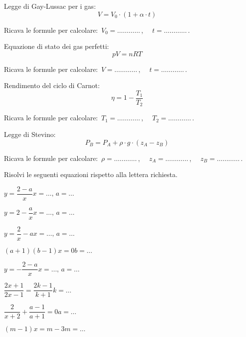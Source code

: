 \begin{esercizio}
\label{ese:20.64}
Legge di Gay-Lussac per i gas:
\begin{equation*}
  V=V_{0}\cdot (1+\alpha \cdot t)
\end{equation*}

Ricava le formule per calcolare:~\(V_0=\ldots\ldots\ldots\ldots\)\,, \(\quad 
t=\ldots\ldots\ldots\ldots\)\,.
\end{esercizio}

\begin{esercizio}
\label{ese:20.65}
Equazione di stato dei gas perfetti:
\begin{equation*}
  pV=nRT
\end{equation*}

Ricava le formule per calcolare:~\(V=\ldots\ldots\ldots\ldots\)\,, \(\quad 
t=\ldots\ldots\ldots\ldots\)\,.
\end{esercizio}

\begin{esercizio}
\label{ese:20.66}
Rendimento del ciclo di Carnot:
\begin{equation*}
  \eta =1-\dfrac{T_{1}}{T_{2}}
\end{equation*}

Ricava le formule per calcolare:~\(T_1=\ldots\ldots\ldots\ldots\)\,, \(\quad 
T_2=\ldots\ldots\ldots\ldots\)\,.
\end{esercizio}

\begin{esercizio}
\label{ese:20.67}
Legge di Stevino:
\begin{equation*}
  P_{B}=P_{A}+\rho \cdot g\cdot (z_{A}-z_{B})
\end{equation*}

Ricava le formule per calcolare:~\(\rho=\ldots\ldots\ldots\ldots\)\,, \(\quad 
z_A=\ldots\ldots\ldots\ldots\)\,, \(\quad z_B =\ldots\ldots\ldots\ldots\)\,.
\end{esercizio}


\begin{esercizio}
\label{ese:20.68}
Risolvi le seguenti equazioni rispetto alla lettera richiesta.
\begin{multicols}{2}
\TabPositions{2.5cm}
\begin{enumeratea}
 \item \(y=\dfrac{2-a}{x}\)\hfill\(x=\ldots,\,a=\ldots\)
 \item \(y=2-\dfrac{a}{x}\)\hfill\(x=\ldots,\,a=\ldots\)
 \item \(y=\dfrac{2}{x}-a\)\hfill\(x=\ldots,\,a=\ldots\)
 \item \((a+1)(b-1)x=0\)\hfill\(b=\ldots\)
 \item \(y=-{\dfrac{2-a}{x}}\)\hfill\(x=\ldots,\,a=\ldots\)
 \item \(\dfrac{2x+1}{2x-1}=\dfrac{2k-1}{k+1}\)\hfill\(k=\ldots\)
 \item \(\dfrac{2}{x+2}+\dfrac{a-1}{a+1}=0\)\hfill\(a=\ldots\)
 \item \((m-1)x=m-3\)\hfill\(m=\ldots\)
\end{enumeratea}
\end{multicols}
\end{esercizio}

